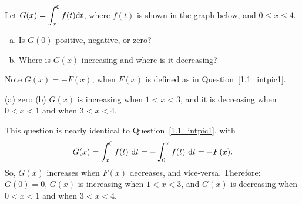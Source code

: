 \begin{question}
Let $G(x) = \displaystyle\int_x^0 f(t)\mathrm{d}t$, where $f(t)$ is shown in the graph below, and $0 \leq x \leq 4$.
\begin{enumerate}[(a)]
\item Is $G(0)$ positive, negative, or zero?
\item Where is $G(x)$ increasing and where is it decreasing?
\end{enumerate}
\begin{center}
\end{center}
\end{question}
\begin{hint}
Note $G(x)=-F(x)$, when $F(x)$ is defined as in Question~\ref{1.1_intpic1}.
\end{hint}
\begin{answer}
(a) zero \qquad (b) $G(x)$ is increasing when $1<x<3$, and it is decreasing when $0<x<1$ and when $3<x<4$.
\end{answer}
\begin{solution}
This question is nearly identical to Question~\ref{1.1_intpic1}, with
\[G(x) = \displaystyle\int_x^0 f(t)\ \mathrm{d}t = -\displaystyle\int_0^x f(t)\ \mathrm{d}t=-F(x).\]
So, $G(x)$ increases when $F(x)$ decreases, and vice-versa. Therefore: $G(0)=0$, $G(x)$ is increasing when $1<x<3$, and $G(x)$ is decreasing when $0<x<1$ and when $3<x<4$.
\end{solution}

